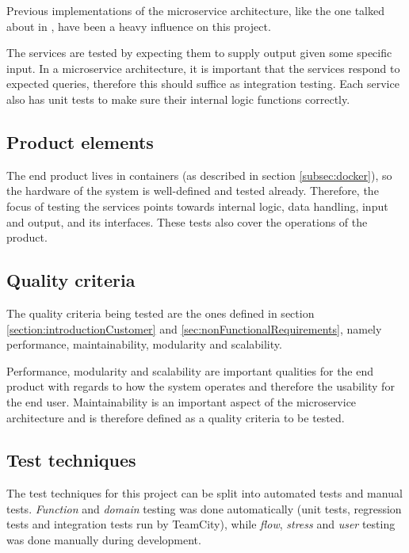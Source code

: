Previous implementations of the microservice architecture, like the one talked about in \citep{nginxMicroservices}, have been a heavy influence on this project.

The services are tested by expecting them to supply output given some specific input. In a microservice architecture, it is important that the services respond to expected queries, therefore this should suffice as integration testing. Each service also has unit tests to make sure their internal logic functions correctly.

\subsection{Product elements}

The end product lives in containers (as described in section \ref{subsec:docker}), so the hardware of the system is well-defined and tested already. Therefore, the focus of testing the services points towards internal logic, data handling, input and output, and its interfaces. These tests also cover the operations of the product.

\subsection{Quality criteria}

The quality criteria being tested are the ones defined in section \ref{section:introductionCustomer} and \ref{sec:nonFunctionalRequirements}, namely performance, maintainability, modularity and scalability.

Performance, modularity and scalability are important qualities for the end product with regards to how the system operates and therefore the usability for the end user. Maintainability is an important aspect of the microservice architecture and is therefore defined as a quality criteria to be tested.

\subsection{Test techniques} \label{subsec:test-techniques} 

The test techniques for this project can be split into automated tests and manual tests. \textit{Function} and \textit{domain} testing was done automatically (unit tests, regression tests and integration tests run by TeamCity), while \textit{flow}, \textit{stress} and \textit{user} testing was done manually during development.

